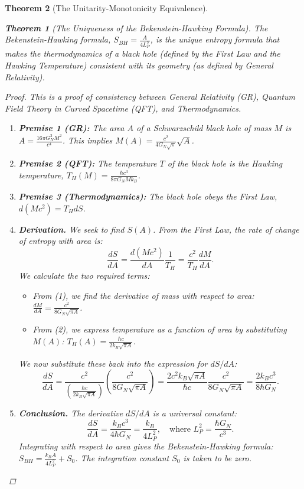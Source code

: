 \documentclass[11pt, letterpaper]{report}
\theoremstyle{plain} %
\newtheorem{theorem}{Theorem}[chapter]
\theoremstyle{definition} %
\theoremstyle{remark} %
\begin{document}
\begin{theorem}[The Unitarity-Monotonicity Equivalence]
\begin{theorem}[The Uniqueness of the Bekenstein-Hawking Formula]
\label{thm:verify_bh_entropy}
The Bekenstein-Hawking formula, $S_{BH} = \frac{A}{4L_P^2}$, is the unique entropy formula that makes the thermodynamics of a black hole (defined by the First Law and the Hawking Temperature) consistent with its geometry (as defined by General Relativity).
\end{theorem}
\begin{proof}
This is a proof of consistency between General Relativity (GR), Quantum Field Theory in Curved Spacetime (QFT), and Thermodynamics.
\begin{enumerate}
    \item \textbf{Premise 1 (GR):} The area $A$ of a Schwarzschild black hole of mass $M$ is $A = \frac{16\pi G_N^2 M^2}{c^4}$. This implies $M(A) = \frac{c^2}{4G_N\sqrt{\pi}}\sqrt{A}$.
    \item \textbf{Premise 2 (QFT):} The temperature $T$ of the black hole is the Hawking temperature, $T_H(M) = \frac{\hbar c^3}{8\pi G_N M k_B}$.
    \item \textbf{Premise 3 (Thermodynamics):} The black hole obeys the First Law, $d(Mc^2) = T_H dS$.
    \item \textbf{Derivation.} We seek to find $S(A)$. From the First Law, the rate of change of entropy with area is:
    \begin{equation}
        \frac{dS}{dA} = \frac{d(Mc^2)}{dA} \frac{1}{T_H} = \frac{c^2}{T_H}\frac{dM}{dA}.
    \end{equation}
    We calculate the two required terms:
    \begin{itemize}
        \item From (1), we find the derivative of mass with respect to area: $\frac{dM}{dA} = \frac{c^2}{8G_N\sqrt{\pi A}}$.
        \item From (2), we express temperature as a function of area by substituting $M(A)$: $T_H(A) = \frac{\hbar c}{2k_B\sqrt{\pi A}}$.
    \end{itemize}
    We now substitute these back into the expression for $dS/dA$:
    \begin{equation}
        \frac{dS}{dA} = \frac{c^2}{\left(\frac{\hbar c}{2k_B\sqrt{\pi A}}\right)} \left( \frac{c^2}{8G_N\sqrt{\pi A}} \right) = \frac{2c^2k_B\sqrt{\pi A}}{\hbar c} \frac{c^2}{8G_N\sqrt{\pi A}} = \frac{2k_B c^3}{8\hbar G_N}.
    \end{equation}
    \item \textbf{Conclusion.} The derivative $dS/dA$ is a universal constant:
    \begin{equation}
        \frac{dS}{dA} = \frac{k_B c^3}{4\hbar G_N} = \frac{k_B}{4 L_P^2}, \quad \text{where } L_P^2 = \frac{\hbar G_N}{c^3}.
    \end{equation}
    Integrating with respect to area gives the Bekenstein-Hawking formula: $S_{BH} = \frac{k_B A}{4 L_P^2} + S_0$. The integration constant $S_0$ is taken to be zero.
\end{enumerate}
\end{proof}


\end{theorem}
\end{document}
